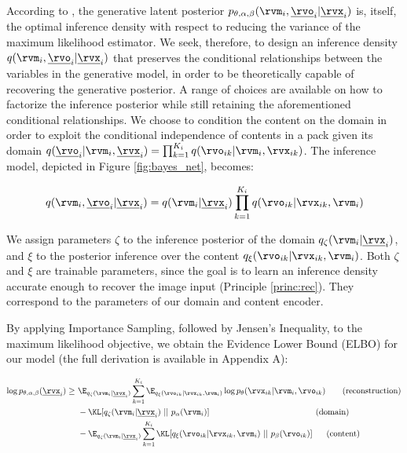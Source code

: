 \documentclass{article} %
\begin{document}
According to \citet{kahn1953methods}, the generative latent posterior $p_{\theta, \alpha, \beta} (\rvm_i, \underline{\rvo}_i | \underline{\rvx}_i)$ is, itself, the optimal inference density with respect to reducing the variance of the maximum likelihood estimator. We seek, therefore, to design an inference density $q(\rvm_i, \underline{\rvo}_i | \underline{\rvx}_i)$ that preserves the conditional relationships between the variables in the generative model, in order to be theoretically capable of recovering the generative posterior. A range of choices are available on how to factorize the inference posterior while still retaining the aforementioned conditional relationships. We choose to condition the content on the domain in order to exploit the conditional independence of contents in a pack given its domain $q(\underline{\rvo}_i | \rvm_i, \underline{\rvx}_i) = \prod_{k=1}^{K_i} q(\rvo_{ik} | \rvm_i, \rvx_{ik})$. The inference model, depicted in Figure \ref{fig:bayes_net}, becomes:

\begin{equation}
q(\rvm_i, \underline{\rvo}_i | \underline{\rvx}_i) = q(\rvm_i | \underline{\rvx}_i) \prod_{k=1}^{K_i} q(\rvo_{ik} | \rvx_{ik}, \rvm_i)
\end{equation}

We assign parameters $\zeta$ to the inference posterior of the domain $q_\zeta (\rvm_i | \underline{\rvx}_i)$, and $\xi$ to the posterior inference over the content $q_\xi (\rvo_{ik} | \rvx_{ik}, \rvm_i)$. Both $\zeta$ and $\xi$ are trainable parameters, since the goal is to learn an inference density accurate enough to recover the image input (Principle \ref{princ:rec}). They correspond to the parameters of our domain and content encoder.

By applying Importance Sampling, followed by Jensen's Inequality, to the maximum likelihood objective, we obtain the Evidence Lower Bound (ELBO) for our model (the full derivation is available in Appendix A):

\begin{align}
\label{eq:elbo}
\log p_{\theta, \alpha, \beta} (\underline{\rvx}_i) \geq ~ & \E_{q_\zeta (\rvm_i | \underline{\rvx}_i)} \sum_{k=1}^{K_i} \E_{q_\xi (\rvo_{ik} | \rvx_{ik}, \rvm_i)} \log p_\theta (\rvx_{ik} | \rvm_i, \rvo_{ik}) ~~~~~~ \textrm{(reconstruction)} \\ & - \KL [q_\zeta (\rvm_i | \underline{\rvx}_i) ~||~ p_\alpha (\rvm_i)] ~~~~~~~~~~~~~~~~~~~~~~~~~~~~~~~~~~~~~~ \textrm{(domain)} \\ & - \E_{q_\zeta (\rvm_i | \underline{\rvx}_i)} \sum_{k=1}^{K_i} \KL [q_\xi (\rvo_{ik} | \rvx_{ik}, \rvm_i) ~||~ p_\beta (\rvo_{ik})] ~~~~~ \textrm{(content)}
\end{align}
\end{document}
